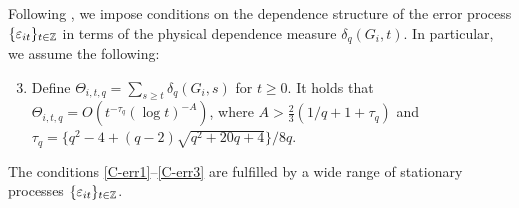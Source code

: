 \documentclass[a4paper,12pt]{article}
\begin{document}
Following \cite{Wu2005}, we impose conditions on the dependence structure of the error process $\{\varepsilon_{it}\}_{t\in\mathbb{Z}}$ in terms of the physical dependence measure $\delta_q(G_i, t)$. In particular, we assume the following: 
\begin{enumerate}[label=(C\arabic*),leftmargin=1.05cm]
\setcounter{enumi}{2}

\item \label{C-err3} Define $\Theta_{i, t,q} = \sum\nolimits_{s \ge t} \delta_q(G_i, s)$ for $t \ge 0$. It holds that 
$\Theta_{i, t,q} = O ( t^{-\tau_q} (\log t)^{-A} )$,  
where $A > \frac{2}{3} (1/q + 1 + \tau_q)$ and $\tau_q = \{q^2 - 4 + (q-2) \sqrt{q^2 + 20q + 4}\} / 8q$. 

\end{enumerate}
The conditions \ref{C-err1}--\ref{C-err3} are fulfilled by a wide range of stationary processes $\{\varepsilon_{it}\}_{t\in\mathbb{Z}}$.%
\end{document}
